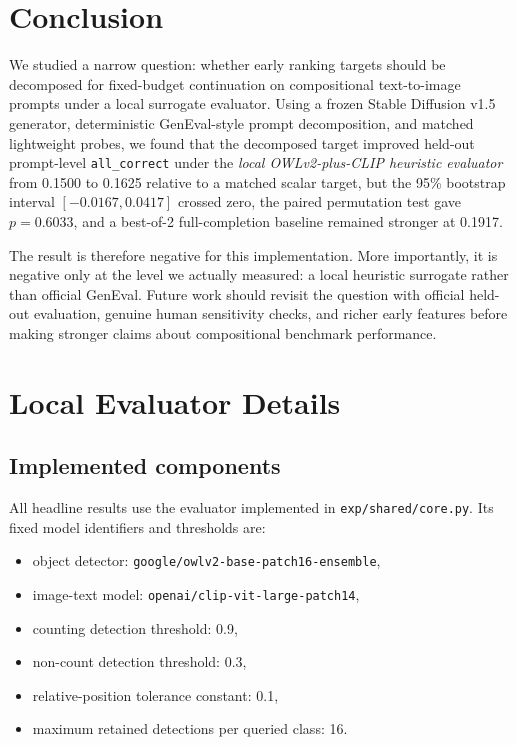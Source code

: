 \documentclass{article}
\begin{document}
\section{Conclusion}
\label{sec:conclusion}
We studied a narrow question: whether early ranking targets should be decomposed for fixed-budget continuation on compositional text-to-image prompts under a local surrogate evaluator. Using a frozen Stable Diffusion v1.5 generator, deterministic GenEval-style prompt decomposition, and matched lightweight probes, we found that the decomposed target improved held-out prompt-level \texttt{all\_correct} under the \emph{local OWLv2-plus-CLIP heuristic evaluator} from 0.1500 to 0.1625 relative to a matched scalar target, but the 95\% bootstrap interval $[-0.0167, 0.0417]$ crossed zero, the paired permutation test gave $p=0.6033$, and a best-of-2 full-completion baseline remained stronger at 0.1917.

The result is therefore negative for this implementation. More importantly, it is negative only at the level we actually measured: a local heuristic surrogate rather than official GenEval. Future work should revisit the question with official held-out evaluation, genuine human sensitivity checks, and richer early features before making stronger claims about compositional benchmark performance.




\appendix

\section{Local Evaluator Details}
\label{app:evaluator}
\subsection{Implemented components}
All headline results use the evaluator implemented in \texttt{exp/shared/core.py}. Its fixed model identifiers and thresholds are:
\begin{itemize}
  \item object detector: \texttt{google/owlv2-base-patch16-ensemble},
  \item image-text model: \texttt{openai/clip-vit-large-patch14},
  \item counting detection threshold: 0.9,
  \item non-count detection threshold: 0.3,
  \item relative-position tolerance constant: 0.1,
  \item maximum retained detections per queried class: 16.
\end{itemize}
\end{document}
